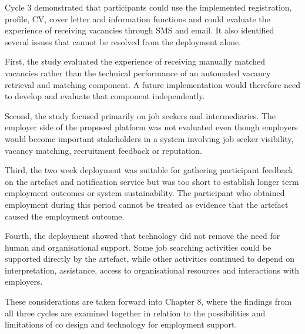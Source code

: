 Cycle 3 demonstrated that participants could use the implemented registration, profile, CV, cover letter and information functions and could evaluate the experience of receiving vacancies through SMS and email. It also identified several issues that cannot be resolved from the deployment alone.

First, the study evaluated the experience of receiving manually matched vacancies rather than the technical performance of an automated vacancy retrieval and matching component. A future implementation would therefore need to develop and evaluate that component independently.

Second, the study focused primarily on job seekers and intermediaries. The employer side of the proposed platform was not evaluated even though employers would become important stakeholders in a system involving job seeker visibility, vacancy matching, recruitment feedback or reputation.

Third, the two week deployment was suitable for gathering participant feedback on the artefact and notification service but was too short to establish longer term employment outcomes or system sustainability. The participant who obtained employment during this period cannot be treated as evidence that the artefact caused the employment outcome.

Fourth, the deployment showed that technology did not remove the need for human and organisational support. Some job searching activities could be supported directly by the artefact, while other activities continued to depend on interpretation, assistance, access to organisational resources and interactions with employers.

These considerations are taken forward into Chapter 8, where the findings from all three cycles are examined together in relation to the possibilities and limitations of co design and technology for employment support.